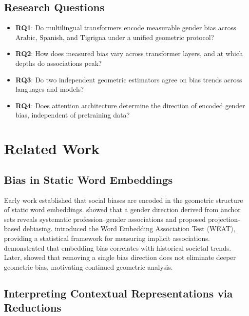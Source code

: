 \documentclass[10pt]{article}
\begin{document}
\subsection{Research Questions}

\begin{itemize}[noitemsep,leftmargin=*]
  \item \textbf{RQ1}: Do multilingual transformers encode measurable gender bias
        across Arabic, Spanish, and Tigrigna under a unified geometric protocol?
  \item \textbf{RQ2}: How does measured bias vary across transformer layers, and
        at which depths do associations peak?
  \item \textbf{RQ3}: Do two independent geometric estimators agree on bias
        trends across languages and models?
  \item \textbf{RQ4}: Does attention architecture determine the direction of
        encoded gender bias, independent of pretraining data?
\end{itemize}

\section{Related Work}

\subsection{Bias in Static Word Embeddings}

Early work established that social biases are encoded in the geometric structure
of static word embeddings. \citet{bolukbasi2016man} showed that a gender
direction derived from anchor sets reveals systematic profession--gender
associations and proposed projection-based debiasing. \citet{caliskan2017semantics}
introduced the Word Embedding Association Test (WEAT), providing a statistical
framework for measuring implicit associations. \citet{garg2018word} demonstrated
that embedding bias correlates with historical societal trends. Later,
\citet{gonen2019lipstick} showed that removing a single bias direction does not
eliminate deeper geometric bias, motivating continued geometric analysis.

\subsection{Interpreting Contextual Representations via Reductions}
\end{document}

